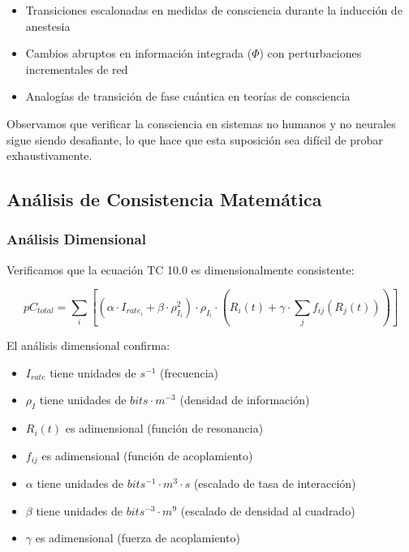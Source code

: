 \documentclass[12pt]{article}
\begin{document}
\begin{itemize}
    \item Transiciones escalonadas en medidas de consciencia durante la inducción de anestesia \cite{chennu2014}
    \item Cambios abruptos en información integrada ($\Phi$) con perturbaciones incrementales de red \cite{tononi2016}
    \item Analogías de transición de fase cuántica en teorías de consciencia \cite{hameroff2014}
\end{itemize}

Observamos que verificar la consciencia en sistemas no humanos y no neurales sigue siendo desafiante, lo que hace que esta suposición sea difícil de probar exhaustivamente.

\subsection{Análisis de Consistencia Matemática}

\subsubsection{Análisis Dimensional}

Verificamos que la ecuación TC 10.0 es dimensionalmente consistente:

\begin{equation}
pC_{total} = \sum_{i} [(\alpha \cdot I_{rate_i} + \beta \cdot \rho_{I_i}^2) \cdot \rho_{I_i} \cdot (R_i(t) + \gamma \cdot \sum_{j} f_{ij}(R_j(t)))]
\end{equation}

El análisis dimensional confirma:
\begin{itemize}
    \item $I_{rate}$ tiene unidades de $s^{-1}$ (frecuencia)
    \item $\rho_I$ tiene unidades de $bits \cdot m^{-3}$ (densidad de información)
    \item $R_i(t)$ es adimensional (función de resonancia)
    \item $f_{ij}$ es adimensional (función de acoplamiento)
    \item $\alpha$ tiene unidades de $bits^{-1} \cdot m^3 \cdot s$ (escalado de tasa de interacción)
    \item $\beta$ tiene unidades de $bits^{-3} \cdot m^9$ (escalado de densidad al cuadrado)
    \item $\gamma$ es adimensional (fuerza de acoplamiento)
\end{itemize}
\end{document}
